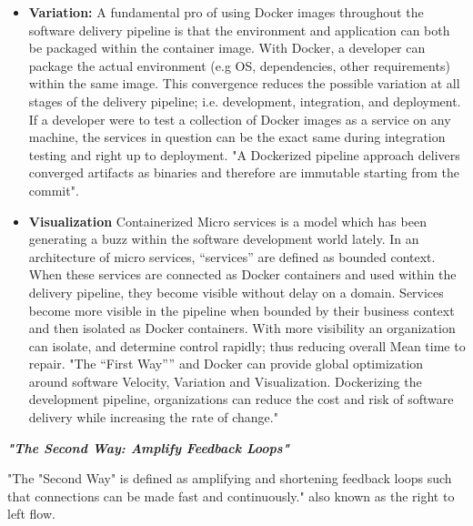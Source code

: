 \begin{itemize}
\begin{itemize}
	\end{itemize}
\item \textbf{Variation:}
	A fundamental pro of using Docker images throughout the software delivery pipeline
is that the environment and application can both be packaged within the container image. With Docker, a developer can package the actual environment (e.g OS, dependencies, other requirements) within the same image. This convergence reduces the possible variation at all stages of the delivery pipeline; i.e. development, integration, and  deployment\cite{willis}. If a developer were to test a collection of Docker images as a service on any machine, the services in question can be the exact same during integration testing and right up to deployment. "A Dockerized pipeline approach delivers converged artifacts as binaries and therefore are immutable starting from the commit"\cite{willis}.
\item \textbf{Visualization}
	Containerized Micro services is a model which has been generating a buzz within the software development world lately. In an architecture of micro services, “services” are defined as bounded context. When these services are connected as Docker containers and used within the delivery pipeline, they become visible without delay on a domain. Services become more visible in the pipeline when bounded by their business context and then isolated as Docker containers. With more visibility an organization can isolate, and determine control rapidly; thus reducing overall Mean time to repair\cite{willis}.
    "The “First Way”” and Docker can provide global optimization around software Velocity, Variation and Visualization. Dockerizing the development pipeline, organizations can reduce the cost and risk of software delivery while increasing the rate of change."\cite{willis} 
\end{itemize}

\textbf{\emph{"The Second Way: Amplify Feedback Loops"}}

"The "Second Way" is defined as amplifying and shortening feedback loops such that connections can be made fast and continuously."\cite{willis} also known as the right to left flow.

